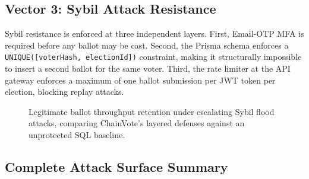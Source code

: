 \documentclass[journal,10pt,twocolumn]{IEEEtran}
\begin{document}
\subsection{Vector 3: Sybil Attack Resistance}

Sybil resistance is enforced at three independent layers. First, Email-OTP MFA is required before any ballot may be cast. Second, the Prisma schema enforces a \texttt{UNIQUE([voterHash, electionId])} constraint, making it structurally impossible to insert a second ballot for the same voter. Third, the rate limiter at the API gateway enforces a maximum of one ballot submission per JWT token per election, blocking replay attacks.

\begin{figure}[htbp]
\centering
{}
\caption{Legitimate ballot throughput retention under escalating Sybil flood attacks, comparing ChainVote's layered defenses against an unprotected SQL baseline.}
\label{fig:sybil_defense}
\end{figure}

\subsection{Complete Attack Surface Summary}
\end{document}

